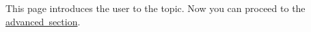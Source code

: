 This page introduces the user to the topic. Now you can proceed to the \mbox{\hyperlink{advanced}{advanced section}}. 